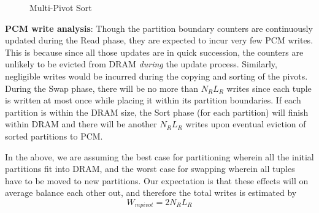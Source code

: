 \begin{figure}[h]
	\centering
	\hspace{0mm}
    \hspace{0mm}
	\caption{Multi-Pivot Sort}
	\label{fig:mpsort}
	
\end{figure}
\textbf{PCM write analysis}: Though the partition boundary counters
are continuously updated during the Read phase, they are expected to
incur very few PCM writes. This is because since all those updates are
in quick succession, the counters are unlikely to be evicted from DRAM
\emph{during} the update process. Similarly, negligible writes would
be incurred during the copying and sorting of the pivots. During the
Swap phase, there will be no more than $N_R L_R$ writes since each tuple is written
at most once while placing it within its partition boundaries. If each
partition is within the DRAM size, the Sort phase (for each partition)
will finish within DRAM and there will be another $N_R L_R$ writes upon
eventual eviction of sorted partitions to PCM. 

In the above, we are assuming the best case for partitioning wherein all the
initial partitions fit into DRAM, and the worst case for swapping wherein
all tuples have to be moved to new partitions. Our expectation is that these
effects will on average balance each other out, and therefore the total writes is
estimated by
\begin{equation}
\label{eq:mpivot}
  W_{mpivot} = 2N_RL_R
\end{equation}









